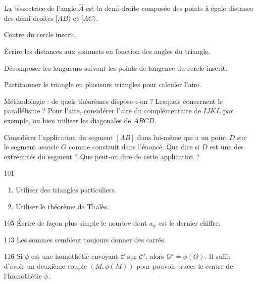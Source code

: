 \begin{Hint}{86}
La bissectrice de l'angle $\widehat A$ est la demi-droite composée des points à égale distance des demi-droites $[AB)$ et $[AC)$.
\end{Hint}
\begin{Hint}{89}
Centre du cercle inscrit.
\end{Hint}
\begin{Hint}{90}
\'Ecrire les distances aux sommets en fonction des angles du triangle.
\end{Hint}
\begin{Hint}{91}
Décomposer les longueurs suivant les points de tangence du cercle inscrit.
\end{Hint}
\begin{Hint}{93}
Partitionner le triangle en plusieurs triangles pour calculer l'aire.
\end{Hint}
\begin{Hint}{98}
 Méthodologie : de quels théorèmes dispose-t-on ? Lesquels concernent le parallélisme ? Pour l'aire, considérer l'aire du complémentaire de $IJKL$ par exemple, ou bien utiliser les diagonales de $ABCD$.
\end{Hint}
\begin{Hint}{99}
 Considérer l'application du segment $[AB]$ dans lui-même qui a un point $D$ sur le segment associe $G$ comme construit dans l'énoncé. Que dire si $D$ est une des extrémités du segment ? Que peut-on dire de cette application ? %
\end{Hint}
\begin{Hint}{101}
\begin{enumerate}
\item Utiliser des triangles particuliers.
\item Utiliser le théorème de Thalès.
\end{enumerate}
\end{Hint}
\begin{Hint}{105}
Écrire de façon plus simple le nombre dont $a_n$ est le dernier chiffre.
\end{Hint}
\begin{Hint}{113}
Les sommes semblent toujours donner des carrés.
\end{Hint}
\begin{Hint}{116}
Si $\phi$ est une homothétie envoyant $\mathcal C$ sur $\mathcal C'$, alors $O'=\phi(O)$. Il suffit d'avoir un deuxième couple $(M, \phi(M))$ pour pouvoir tracer le centre de l'homothétie $\phi$.
\end{Hint}
